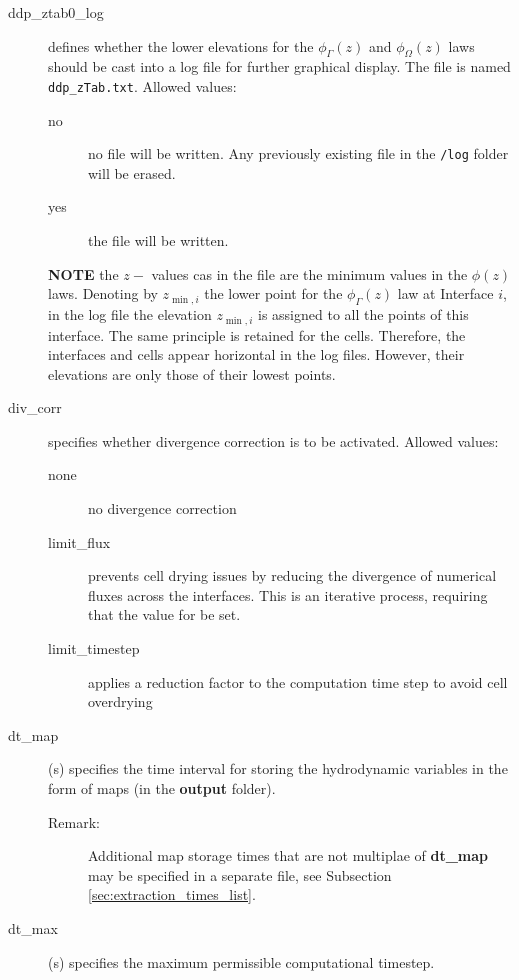 \begin{description}
\item [ddp\_ztab0\_log]    defines whether the lower elevations for the $\phi_\Gamma (z)$ and $\phi_\Omega (z)$ laws should be cast into a log file for further graphical display. The file is named \texttt{ddp\_zTab.txt}. Allowed values:
\begin{description}
\item [no] no file will be written. Any previously existing file in the \texttt{/log} folder will be erased.
\item [yes] the file will be written.
\end{description}
\textbf{NOTE} the $z-$ values cas in the file are the minimum values in the $\phi(z)$ laws. Denoting by $z_{\min,i}$ the lower point for the $\phi_\Gamma(z)$ law at Interface $i$, in the log file the elevation $z_{\min,i}$ is assigned to all the points of this interface. The same principle is retained for the cells. Therefore, the interfaces and cells appear horizontal in the log files. However, their elevations are only those of their lowest points.

\item[div\_corr] specifies whether divergence correction is to be activated. Allowed values:
\begin{description}
    \item[none] no divergence correction
    \item[limit\_flux]  prevents cell drying issues by reducing the divergence of numerical fluxes across the interfaces. This is an iterative process, requiring that the value for  be set.
    \item[limit\_timestep] applies a reduction factor to the computation time step to avoid cell overdrying
\end{description}

\item[dt\_map](s) specifies the time interval for storing the hydrodynamic variables in the form of maps (in the \textbf{output} folder).
\begin{description}
	\item[Remark:] Additional map storage times that are not multiplae of \textbf{dt\_map} may be specified in a separate file, see Subsection \ref{sec:extraction_times_list}.
\end{description}

\item[dt\_max](s) specifies the maximum permissible computational timestep.


\end{description}
